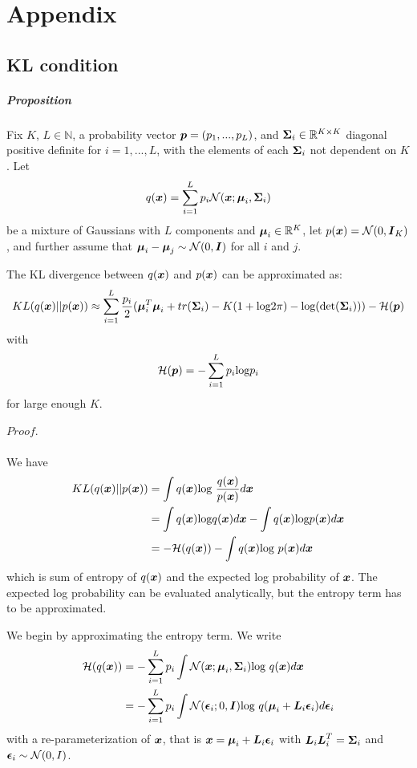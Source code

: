 \chapter{Appendix}
\section{KL condition}
\label{appendix:kl_condition}
\paragraph{Proposition} Fix $K$, $L \in \mathbb N$, a probability vector $\boldsymbol p = (p_{1}, ..., p_{L})$, and $\boldsymbol \Sigma_{i} \in \mathbb R^{K \times K}$ diagonal positive definite for $i=1,...,L$, with the elements of each $\boldsymbol \Sigma_{i}$ not dependent on $K$. Let
\[
q(\boldsymbol x) = \sum_{i=1}^{L} p_{i}\mathcal N(\boldsymbol x; \boldsymbol \mu_{i}, \boldsymbol \Sigma_{i}) 
\]
be a mixture of Gaussians with $L$ components and $\boldsymbol \mu_{i} \in \mathbb R^{K}$, let $p(\boldsymbol x) = \mathcal N(0, \boldsymbol I_{K})$, and further assume that $\boldsymbol \mu_{i} - \boldsymbol \mu_{j} \sim \mathcal N(0, \boldsymbol I)$ for all $i$ and $j$.

The KL divergence between $q(\boldsymbol x)$ and $p(\boldsymbol x)$ can be approximated as:
\[ 
KL(q(\boldsymbol x) || p(\boldsymbol x)) \approx \sum_{i=1}^{L}\frac{p_{i}}{2}(\boldsymbol \mu_{i}^{T} \boldsymbol \mu_{i} + tr(\boldsymbol \Sigma_{i}) - K(1+\text{log}2\pi) - \text{log}(\text{det}(\boldsymbol \Sigma_{i}))) - \mathcal H (\boldsymbol p)
\] 
with 
\[
\mathcal H(\boldsymbol p) = -\sum_{i=1}^{L}p_{i}\text{log}p_{i}
\]
for large enough $K$. 

\paragraph{$Proof.$}
We have 
\[
\begin{aligned}
KL(q(\boldsymbol x) || p(\boldsymbol x)) &= \int q(\boldsymbol x) \text{log }\frac{q(\boldsymbol x)}{p(\boldsymbol x)} d\boldsymbol x \\
&=\int q(\boldsymbol x) \text{log} q(\boldsymbol x) d\boldsymbol x - \int q(\boldsymbol x)\text{log} p(\boldsymbol x) d\boldsymbol x \\
&=-\mathcal H(q(\boldsymbol x)) - \int q(\boldsymbol x)\text{log } p(\boldsymbol x) d\boldsymbol x 
\end{aligned}
\]
which is sum of entropy of $q(\boldsymbol x)$ and the expected log probability of $\boldsymbol x$. The expected log probability can be evaluated analytically, but the entropy term has to be approximated.

We begin by approximating the entropy term. We write 
\[
\begin{aligned}
\mathcal H(q(\boldsymbol x)) &= -\sum_{i=1}^{L}p_{i}\int \mathcal N(\boldsymbol x; \boldsymbol \mu_{i}, \boldsymbol \Sigma_{i})\text{log }q(\boldsymbol x)d\boldsymbol x \\
&=-\sum_{i=1}^{L} p_{i}\int \mathcal N(\boldsymbol \epsilon_{i}; 0, \boldsymbol I) \text{log } q(\boldsymbol \mu_{i} + \boldsymbol L_{i} \boldsymbol \epsilon_{i}) d\boldsymbol \epsilon_{i} \\ 
\end{aligned}
\] 
with a re-parameterization of $\boldsymbol x$, that is $\boldsymbol x = \boldsymbol \mu_{i} + \boldsymbol L_{i} \boldsymbol \epsilon_{i}$ with $\boldsymbol L_{i} \boldsymbol L_{i}^{T} = \boldsymbol \Sigma_{i}$ and $\boldsymbol \epsilon_{i} \sim \mathcal N(0, I)$.

